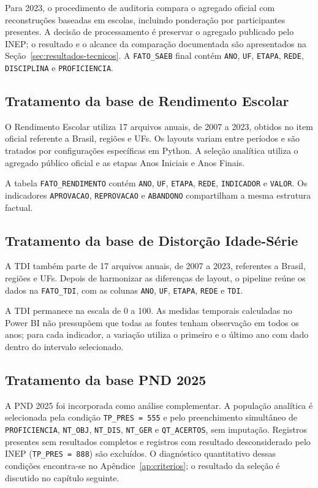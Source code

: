 Para 2023, o procedimento de auditoria compara o agregado oficial com reconstruções baseadas em escolas, incluindo ponderação por participantes presentes. A decisão de processamento é preservar o agregado publicado pelo INEP; o resultado e o alcance da comparação documentada são apresentados na Seção~\ref{sec:resultados-tecnicos}. A \texttt{FATO\_SAEB} final contém \texttt{ANO}, \texttt{UF}, \texttt{ETAPA}, \texttt{REDE}, \texttt{DISCIPLINA} e \texttt{PROFICIENCIA}.

\subsection{Tratamento da base de Rendimento Escolar}

O Rendimento Escolar utiliza 17 arquivos anuais, de 2007 a 2023, obtidos no item oficial referente a Brasil, regiões e UFs. Os layouts variam entre períodos e são tratados por configurações específicas em Python. A seleção analítica utiliza o agregado público oficial e as etapas Anos Iniciais e Anos Finais.

A tabela \texttt{FATO\_RENDIMENTO} contém \texttt{ANO}, \texttt{UF}, \texttt{ETAPA}, \texttt{REDE}, \texttt{INDICADOR} e \texttt{VALOR}. Os indicadores \texttt{APROVACAO}, \texttt{REPROVACAO} e \texttt{ABANDONO} compartilham a mesma estrutura factual.

\subsection{Tratamento da base de Distorção Idade-Série}

A TDI também parte de 17 arquivos anuais, de 2007 a 2023, referentes a Brasil, regiões e UFs. Depois de harmonizar as diferenças de layout, o pipeline reúne os dados na \texttt{FATO\_TDI}, com as colunas \texttt{ANO}, \texttt{UF}, \texttt{ETAPA}, \texttt{REDE} e \texttt{TDI}.

A TDI permanece na escala de 0 a 100. As medidas temporais calculadas no Power BI não pressupõem que todas as fontes tenham observação em todos os anos; para cada indicador, a variação utiliza o primeiro e o último ano com dado dentro do intervalo selecionado.

\subsection{Tratamento da base PND 2025}

A PND 2025 foi incorporada como análise complementar. A população analítica é selecionada pela condição \texttt{TP\_PRES = 555} e pelo preenchimento simultâneo de \texttt{PROFICIENCIA}, \texttt{NT\_OBJ}, \texttt{NT\_DIS}, \texttt{NT\_GER} e \texttt{QT\_ACERTOS}, sem imputação. Registros presentes sem resultados completos e registros com resultado desconsiderado pelo INEP (\texttt{TP\_PRES = 888}) são excluídos. O diagnóstico quantitativo dessas condições encontra-se no Apêndice~\ref{ap:criterios}; o resultado da seleção é discutido no capítulo seguinte.

